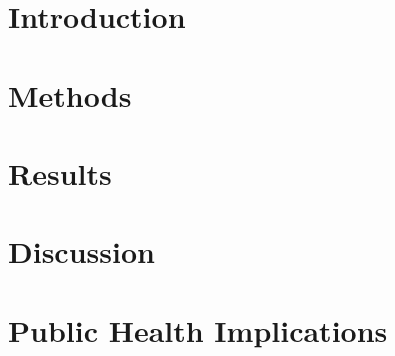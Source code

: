 \documentclass{bioinfo}
\begin{document}
\section{Introduction}


\section{Methods}
\begin{methods}

\end{methods}

\section{Results}


\section{Discussion}


\section{Public Health Implications}



%

%

\end{document}
